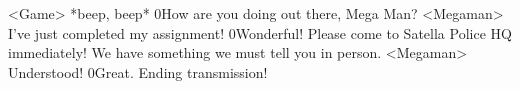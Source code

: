 <Game> *beep, beep* 
0How are you doing out there, Mega Man? 
<Megaman> I've just completed my assignment! 
0Wonderful! 
Please come to Satella Police HQ immediately! 
We have something we must tell you in person. 
<Megaman> Understood! 
0Great. 
Ending transmission! 
